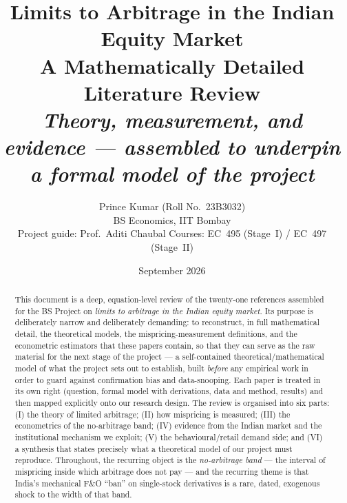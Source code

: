 \documentclass[11pt,a4paper]{article}
\title{\vspace{-1.2cm}\color{accent}\bfseries Limits to Arbitrage in the Indian Equity Market\\[0.3cm]
\large\mdseries\color{black} A Mathematically Detailed Literature Review\\
\normalsize\itshape Theory, measurement, and evidence --- assembled to underpin a formal model of the project}
\author{Prince Kumar \quad(Roll No.\ 23B3032)\\ \small BS Economics, IIT Bombay \\[0.2cm]
\small Project guide: Prof.\ Aditi Chaubal \quad\textbar\quad Courses: EC~495 (Stage~I) / EC~497 (Stage~II)}
\date{September 2026}
\newcommand{\1}{\mathbf{1}}
\begin{document}
\maketitle
\thispagestyle{empty}

\begin{abstract}
\noindent This document is a deep, equation-level review of the twenty-one references assembled for the BS Project on \emph{limits to arbitrage in the Indian equity market}. Its purpose is deliberately narrow and deliberately demanding: to reconstruct, in full mathematical detail, the theoretical models, the mispricing-measurement definitions, and the econometric estimators that these papers contain, so that they can serve as the raw material for the next stage of the project --- a self-contained theoretical/mathematical model of what the project sets out to establish, built \emph{before} any empirical work in order to guard against confirmation bias and data-snooping. Each paper is treated in its own right (question, formal model with derivations, data and method, results) and then mapped explicitly onto our research design. The review is organised into six parts: (I) the theory of limited arbitrage; (II) how mispricing is measured; (III) the econometrics of the no-arbitrage band; (IV) evidence from the Indian market and the institutional mechanism we exploit; (V) the behavioural/retail demand side; and (VI) a synthesis that states precisely what a theoretical model of our project must reproduce. Throughout, the recurring object is the \emph{no-arbitrage band} --- the interval of mispricing inside which arbitrage does not pay --- and the recurring theme is that India's mechanical F\&O ``ban'' on single-stock derivatives is a rare, dated, exogenous shock to the width of that band.
\end{abstract}

\vspace{0.4cm}
\begin{center}
\end{center}
\end{document}
